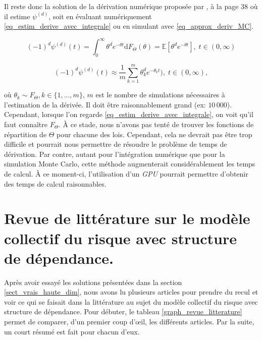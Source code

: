 \documentclass{article}
\begin{document}
	Il reste donc la solution de la dérivation numérique proposée par \cite{hofert2013ArchimedeanHighDimension}, à la page 38 où il estime $\psi^{(d)}$, soit en évaluant numériquement \eqref{eq_estim_derive_avec_integrale} ou en simulant avec \eqref{eq_approx_deriv_MC}.
	
	\begin{equation}\label{eq_estim_derive_avec_integrale}
		(-1)^d \psi^{(d)}(t) = \int_{0}^{\infty} \theta^d e^{-\theta t} \textrm{d}F_\Theta(\theta) = \mathbb{E}\left[\theta^d e^{-\theta t} \right],\; t \in(0,\infty)
	\end{equation}
	 
	\begin{equation}\label{eq_approx_deriv_MC}
		(-1)^d \psi^{(d)}(t) \approx \frac{1}{m} \sum_{k=1}^{m} \theta_{k}^{d} e^{-\theta_{k}t}),\; t \in(0,\infty),
	\end{equation}
	
	où $\theta_k \sim F_{\Theta}, k \in \{1,...,m\}$, $m$ est le nombre de simulations nécessaires à l'estimation de la dérivée. Il doit être raisonnablement grand (ex: $10\,000$). Cependant, lorsque l'on regarde \eqref{eq_estim_derive_avec_integrale}, on voit qu'il faut connaître $F_{\Theta}$. À ce stade, nous n'avons pas tenté de trouver les fonctions de répartition de $\Theta$ pour chacune des lois. Cependant, cela ne devrait pas être trop difficile et pourrait nous permettre de résoudre le problème de temps de dérivation. Par contre, autant pour l'intégration numérique que pour la simulation Monte Carlo, cette méthode augmenterait considérablement les temps de calcul. À ce moment-ci, l'utilisation d'un \textit{GPU} pourrait permettre d'obtenir des temps de calcul raisonnables.\\
	
	\section{Revue de littérature sur le modèle collectif du risque avec structure de dépendance.} 
	\label{sect_revue_litterature}
	Après avoir essayé les solutions présentées dans la section \ref{sect_vrais_haute_dim}, nous avons lu plusieurs articles pour prendre du recul et voir ce qui se faisait dans la littérature au sujet du modèle collectif du risque avec structure de dépendance. Pour débuter, le tableau \ref{graph_revue_litterature} permet de comparer, d'un premier coup d'œil, les différents articles. Par la suite, un court résumé est fait pour chacun d'eux.
	
\end{document}
